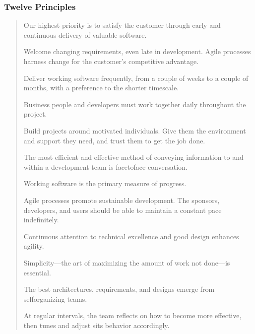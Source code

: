\documentclass[letterpaper,10pt,english]{jupyterBook}
\begin{document}
\subsubsection{Twelve Principles}
\label{\detokenize{APM/agile:twelve-principles}}\begin{quote}

\sphinxAtStartPar
Our highest priority is to satisfy the customer through early and continuous delivery of valuable software.

\sphinxAtStartPar
Welcome changing requirements, even late in development. Agile processes harness change for the customer’s competitive advantage.

\sphinxAtStartPar
Deliver working software frequently, from a couple of weeks to a couple of months, with a preference to the shorter timescale.

\sphinxAtStartPar
Business people and developers must work together daily throughout the project.

\sphinxAtStartPar
Build projects around motivated individuals. Give them the environment and support they need, and trust them to get the job done.

\sphinxAtStartPar
The most efficient and effective method of conveying information to and within a development team is face\sphinxhyphen{}to\sphinxhyphen{}face conversation.

\sphinxAtStartPar
Working software is the primary measure of progress.

\sphinxAtStartPar
Agile processes promote sustainable development. The sponsors, developers, and users should be able to maintain a constant pace indefinitely.

\sphinxAtStartPar
Continuous attention to technical excellence and good design enhances agility.

\sphinxAtStartPar
Simplicity—the art of maximizing the amount of work not done—is essential.

\sphinxAtStartPar
The best architectures, requirements, and designs emerge from self\sphinxhyphen{}organizing teams.

\sphinxAtStartPar
At regular intervals, the team reflects on how to become more effective, then tunes and adjust sits behavior accordingly.
\end{quote}
\end{document}
